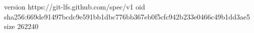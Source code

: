 version https://git-lfs.github.com/spec/v1
oid sha256:669de91497bcdc9e591bb1dbc776bb367eb0f5cfc942b233e0466c49b1dd3ae5
size 262240
